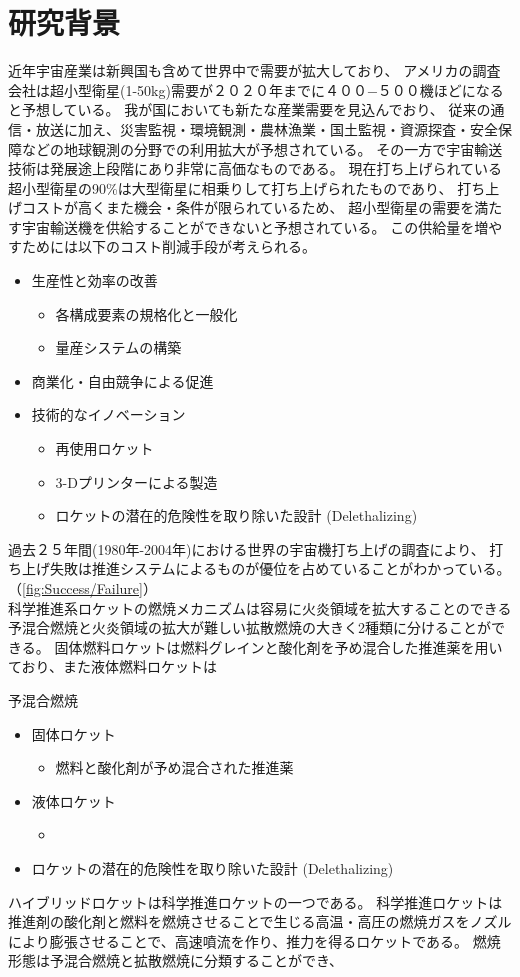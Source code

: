 \section{研究背景}
%
%
近年宇宙産業は新興国も含めて世界中で需要が拡大しており、
アメリカの調査会社は超小型衛星(1-50kg)需要が２０２０年までに４００−５００機ほどになると予想している。\cite{nano/micro}
我が国においても新たな産業需要を見込んでおり、
従来の通信・放送に加え、災害監視・環境観測・農林漁業・国土監視・資源探査・安全保障などの地球観測の分野での利用拡大が予想されている。
その一方で宇宙輸送技術は発展途上段階にあり非常に高価なものである。
現在打ち上げられている超小型衛星の90\%は大型衛星に相乗りして打ち上げられたものであり、
打ち上げコストが高くまた機会・条件が限られているため、
超小型衛星の需要を満たす宇宙輸送機を供給することができないと予想されている。
この供給量を増やすためには以下のコスト削減手段が考えられる。
\begin{itemize}
	\item 生産性と効率の改善
	\begin{itemize}
		\item 各構成要素の規格化と一般化
		\item 量産システムの構築
	\end{itemize}
	\item 商業化・自由競争による促進
	\item 技術的なイノベーション
	\begin{itemize}
		\item 再使用ロケット
		\item 3-Dプリンターによる製造
		\item ロケットの潜在的危険性を取り除いた設計 (Delethalizing)
	\end{itemize}
\end{itemize}
過去２５年間(1980年-2004年)における世界の宇宙機打ち上げの調査により、
打ち上げ失敗は推進システムによるものが優位を占めていることがわかっている。（\ref{fig:Success/Failure}）\cite{failure}
\\
科学推進系ロケットの燃焼メカニズムは容易に火炎領域を拡大することのできる予混合燃焼と火炎領域の拡大が難しい拡散燃焼の大きく2種類に分けることができる。
固体燃料ロケットは燃料グレインと酸化剤を予め混合した推進薬を用いており、また液体燃料ロケットは
\begin{description}
	\item 予混合燃焼
	\begin{itemize}
		\item 固体ロケット
		\begin{itemize}
			\item 燃料と酸化剤が予め混合された推進薬
		\end{itemize}
		\item 液体ロケット
		\begin{itemize}
			\item 
		\end{itemize}
		\item ロケットの潜在的危険性を取り除いた設計 (Delethalizing)
	\end{itemize}
\end{description}


ハイブリッドロケットは科学推進ロケットの一つである。
科学推進ロケットは推進剤の酸化剤と燃料を燃焼させることで生じる高温・高圧の燃焼ガスをノズルにより膨張させることで、高速噴流を作り、推力を得るロケットである。
燃焼形態は予混合燃焼と拡散燃焼に分類することができ、
